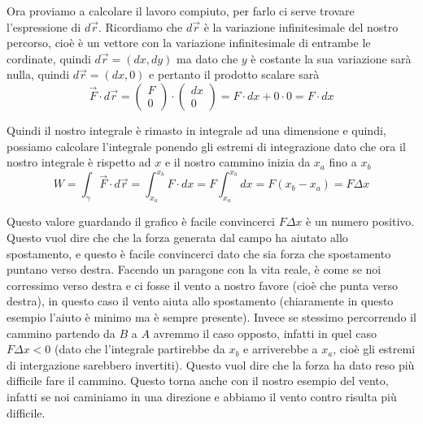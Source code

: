 \documentclass{rapport}
\begin{document}
Ora proviamo a calcolare il lavoro compiuto, per farlo ci serve trovare l'espressione di $d\vec{r}$. Ricordiamo che $d\vec{r}$ è la variazione infinitesimale del nostro percorso, cioè è un vettore con la variazione infinitesimale di entrambe le cordinate, quindi $d\vec{r} = (dx, dy)$ ma dato che $y$ è costante la sua variazione sarà nulla, quindi $d\vec{r} = (dx, 0)$ e pertanto il prodotto scalare sarà
\[
\vec{F} \cdot d\vec{r} = \begin{pmatrix}
  F \\
   0
\end{pmatrix} \cdot 
\begin{pmatrix}
  dx \\
  0
\end{pmatrix} = F\cdot dx + 0\cdot 0 = F\cdot dx
\] 

Quindi il nostro integrale è rimasto in integrale ad una dimensione e quindi, possiamo calcolare l'integrale ponendo gli estremi di integrazione dato che ora il nostro integrale è rispetto ad $x$ e il nostro cammino inizia da $x_a$ fino a $x_b$
\[
W = \int_{\gamma} \vec{F} \cdot d\vec{r} = \int_{x_a}^{x_b} F\cdot dx = F\int_{x_a}^{x_b} dx = F(x_b-x_a) = F\Delta x
\] 

Questo valore guardando il grafico è facile convincerci $F\Delta x$ è un numero positivo. Questo vuol dire che che la forza generata dal campo ha aiutato allo spostamento, e questo è facile convincerci dato che sia forza che spostamento puntano verso destra. Facendo un paragone con la vita reale, è come se noi corressimo verso destra e ci fosse il vento a nostro favore (cioè che punta verso destra), in questo caso il vento aiuta allo spostamento (chiaramente in questo esempio l'aiuto è minimo ma è sempre presente). Invece se stessimo percorrendo il cammino partendo da $B$ a $A$ avremmo il caso opposto, infatti in quel caso $F\Delta x< 0$ (dato che l'integrale partirebbe da $x_b$ e arriverebbe a $x_a$, cioè gli estremi di intergazione sarebbero invertiti). Questo vuol dire che la forza ha dato reso più difficile fare il cammino. Questo torna anche con il nostro esempio del vento, infatti se noi caminiamo in una direzione e abbiamo il vento contro risulta più difficile.  
\end{document}
